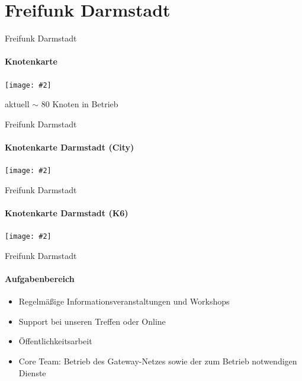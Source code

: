 \documentclass{beamer}
\newcommand{\centeredimage}[2][ ]{
        \begin{center}
            \texttt{[image: \#2]} $\;$

            \tiny{#1}
        \end{center}
}
\begin{document}
\section{Freifunk Darmstadt}
\begin{frame}{Freifunk Darmstadt}
\framesubtitle{Knotenkarte}
\centeredimage[aktuell $\sim$ 80 Knoten in Betrieb]{images/ffmap_darmstadt}
\end{frame}

\begin{frame}{Freifunk Darmstadt}
\framesubtitle{Knotenkarte Darmstadt (City)}
\centeredimage{images/ffmap_darmstadt_city}
\end{frame}

\begin{frame}{Freifunk Darmstadt}
\framesubtitle{Knotenkarte Darmstadt (K6)}
\centeredimage{images/ffmap_darmstadt_k6}
\end{frame}

\begin{frame}{Freifunk Darmstadt}
\framesubtitle{Aufgabenbereich}
\begin{itemize}
\item Regelmäßige Informationsveranstaltungen und Workshops
\item Support bei unseren Treffen oder Online
\item Öffentlichkeitsarbeit
\item Core Team: Betrieb des Gateway-Netzes sowie der zum Betrieb notwendigen Dienste
\end{itemize}
\end{frame}
\end{document}
